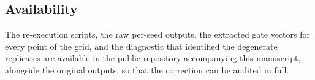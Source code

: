 \subsection*{Availability}

The re-execution scripts, the raw per-seed outputs, the extracted gate
vectors for every point of the grid, and the diagnostic that identified the
degenerate replicates are available in the public repository accompanying
this manuscript, alongside the original outputs, so that the correction can
be audited in full.

